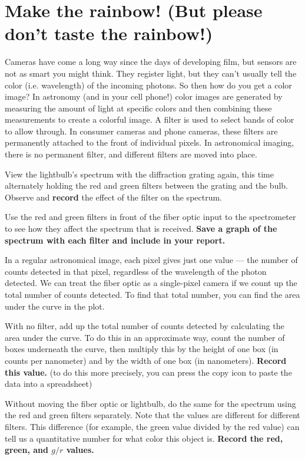 \section{Make the rainbow! (But please don't taste the rainbow!)}

Cameras have come a long way since the days of developing film, but sensors are not as smart you might think. They register light, but they can't usually tell the color (i.e. wavelength) of the incoming photons. So then how do you get a color image? In astronomy (and in your cell phone!) color images are generated by measuring the amount of light at specific colors and then combining these measurements to create a colorful image. A filter is used to select bands of color to allow through. In consumer cameras and phone cameras, these filters are permanently attached to the front of individual pixels. In astronomical imaging, there is no permanent filter, and different filters are moved into place.

\begin{steps}
	\item\label{ic:it:filteffect1} View the lightbulb's spectrum with the diffraction grating again, this time alternately holding the red and green filters between the grating and the bulb. Observe and \textbf{record} the effect of the filter on the spectrum.
	
	\item\label{ic:it:filteffect2} Use the red and green filters in front of the fiber optic input to the spectrometer to see how they affect the spectrum that is received. \textbf{Save a graph of the spectrum with each filter and include in your report.}
\end{steps}

In a regular astronomical image, each pixel gives just one value --- the number of counts detected in that pixel, regardless of the wavelength of the photon detected. We can treat the fiber optic as a single-pixel camera if we count up the total number of counts detected. To find that total number, you can find the area under the curve in the plot.

\begin{steps}
	\item\label{ic:it:intens1} With no filter, add up the total number of counts detected by calculating the area under the curve. To do this in an approximate way, count the number of boxes underneath the curve, then multiply this by the height of one box (in counts per nanometer) and by the width of one box (in nanometers). \textbf{Record this value.} (to do this more precisely, you can press the copy icon to paste the data into a spreadsheet)
	
	\item\label{ic:it:intens2} Without moving the fiber optic or lightbulb, do the same for the spectrum using the red and green filters separately. Note that the values are different for different filters. This difference (for example, the green value divided by the red value) can tell us a quantitative number for what color this object is. \textbf{Record the red, green, and $g/r$ values.}
\end{steps}

